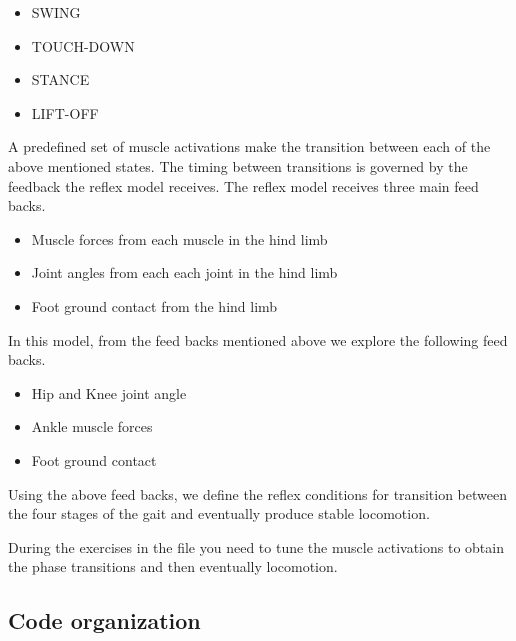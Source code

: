 \documentclass{cmc}
\begin{document}
\begin{itemize}
\item SWING
\item TOUCH-DOWN
\item STANCE
\item LIFT-OFF
\end{itemize}

A predefined set of muscle activations make the transition between
each of the above mentioned states.  The timing between transitions is
governed by the feedback the reflex model receives. The reflex model
receives three main feed backs.
\begin{itemize}
\item Muscle forces from each muscle in the hind limb
\item Joint angles from each each joint in the hind limb
\item Foot ground contact from the hind limb
\end{itemize}

In this model, from the feed backs mentioned above we explore the
following feed backs.

\begin{itemize}
\item Hip and Knee joint angle
\item Ankle muscle forces
\item Foot ground contact
\end{itemize}

Using the above feed backs, we define the reflex conditions for
transition between the four stages of the gait and eventually produce
stable locomotion.

During the exercises in the file  you need to tune
the muscle activations to obtain the phase transitions and then
eventually locomotion.

\newpage

\subsection*{Code organization}
\label{subsec:code}
\end{document}
